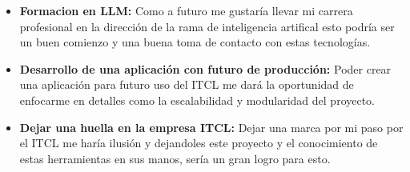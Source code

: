 \begin{itemize}

    \item\textbf{Formacion en LLM:} Como a futuro me gustaría llevar mi carrera profesional en la dirección de la rama de inteligencia artifical esto podría ser un buen comienzo y una buena toma de contacto con estas tecnologías.
    
    \item\textbf{Desarrollo de una aplicación con futuro de producción:} Poder crear una aplicación para futuro uso del ITCL me dará la oportunidad de enfocarme en detalles como la escalabilidad y modularidad del proyecto.
    
    \item\textbf{Dejar una huella en la empresa ITCL:} Dejar una marca por mi paso por el ITCL me haría ilusión y dejandoles este proyecto y el conocimiento de estas herramientas en sus manos, sería un gran logro para esto.
    
\end{itemize}